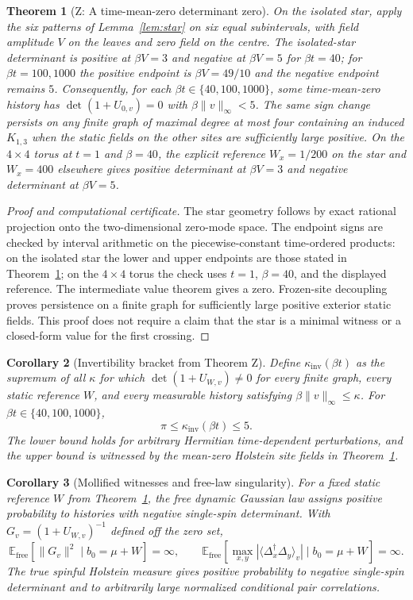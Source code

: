 \documentclass[11pt]{article}
\newtheorem{theorem}{Theorem}[section]
\newtheorem{corollary}[theorem]{Corollary}
\theoremstyle{definition}
\theoremstyle{remark}
\newcommand{\E}{\mathbb{E}}
\newcommand{\free}{\mathrm{free}}
\newcommand{\Kinv}{\kappa_{\mathrm{inv}}}
\begin{document}
\begin{theorem}[Z: A time-mean-zero determinant zero]\label{thm:Z}
On the isolated star, apply the six patterns of Lemma~\ref{lem:star} on six equal subintervals, with field amplitude $V$ on the leaves and zero field on the centre. The isolated-star determinant is positive at $\beta V=3$ and negative at $\beta V=5$ for $\beta t=40$; for $\beta t=100,1000$ the positive endpoint is $\beta V=49/10$ and the negative endpoint remains $5$. Consequently, for each $\beta t\in\{40,100,1000\}$, some time-mean-zero history has $\det(1+U_{0,v})=0$ with $\beta\|v\|_\infty<5$. The same sign change persists on any finite graph of maximal degree at most four containing an induced $K_{1,3}$ when the static fields on the other sites are sufficiently large positive. On the $4\times4$ torus at $t=1$ and $\beta=40$, the explicit reference $W_x=1/200$ on the star and $W_x=400$ elsewhere gives positive determinant at $\beta V=3$ and negative determinant at $\beta V=5$.
\end{theorem}

\begin{proof}[Proof and computational certificate]
The star geometry follows by exact rational projection onto the two-dimensional zero-mode space. The endpoint signs are checked by interval arithmetic on the piecewise-constant time-ordered products: on the isolated star the lower and upper endpoints are those stated in Theorem~\ref{thm:Z}; on the $4\times4$ torus the check uses $t=1$, $\beta=40$, and the displayed reference. The intermediate value theorem gives a zero. Frozen-site decoupling proves persistence on a finite graph for sufficiently large positive exterior static fields. This proof does not require a claim that the star is a minimal witness or a closed-form value for the first crossing.
\end{proof}

\begin{corollary}[Invertibility bracket from Theorem Z]\label{cor:kappa}
Define $\Kinv(\beta t)$ as the supremum of all $\kappa$ for which $\det(1+U_{W,v})\ne0$ for every finite graph, every static reference $W$, and every measurable history satisfying $\beta\|v\|_\infty\leq\kappa$. For $\beta t\in\{40,100,1000\}$,
\[
 \pi\leq\Kinv(\beta t)\leq5.
\]
The lower bound holds for arbitrary Hermitian time-dependent perturbations, and the upper bound is witnessed by the mean-zero Holstein site fields in Theorem~\ref{thm:Z}.
\end{corollary}

\begin{corollary}[Mollified witnesses and free-law singularity]\label{cor:sing}
For a fixed static reference $W$ from Theorem~\ref{thm:Z}, the free dynamic Gaussian law assigns positive probability to histories with negative single-spin determinant. With $G_v=(1+U_{W,v})^{-1}$ defined off the zero set,
\[
 \E_{\free}\!\left[\|G_v\|^2\mid b_0=\mu+W\right]=\infty,\qquad
 \E_{\free}\!\left[\max_{x,y}|\langle\Delta_x^\dagger\Delta_y\rangle_v|\mid b_0=\mu+W\right]=\infty.
\]
The true spinful Holstein measure gives positive probability to negative single-spin determinant and to arbitrarily large normalized conditional pair correlations.
\end{corollary}
\end{document}
